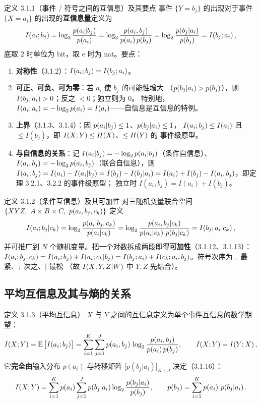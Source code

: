 \begin{defbox}{定义 3.1.1（事件 / 符号之间的互信息）及其要点}
事件 $\{Y=b_j\}$ 的出现对于事件 $\{X=a_i\}$ 的出现的\textbf{互信息量}定义为
\[
\I{a_i;b_j}=\lb\frac{\p{a_i|b_j}}{\p{a_i}}
=\lb\frac{\p{a_i,b_j}}{\p{a_i}\p{b_j}}
=\lb\frac{\p{b_j|a_i}}{\p{b_j}}=\I{b_j;a_i},
\]
底取 $2$ 时单位为 bit，取 $\mathrm{e}$ 时为 nat。要点：
\begin{enumerate}[leftmargin=1.6em,itemsep=0pt,topsep=1pt]
  \item \textbf{对称性}（3.1.2）：$I\!\left(a_i;b_j\right)=I\!\left(b_j;a_i\right)$。
  \item \textbf{可正、可负、可为零}：若 $a_i$ 使 $b_j$ 的可能性增大
        （$p\!\left(b_j|a_i\right)>p\!\left(b_j\right)$），则 $I\!\left(b_j;a_i\right)>0$；反之 $<0$；独立则为 $0$。
        特别地，$I\!\left(a_i;a_i\right)=-\log_{2}p\!\left(a_i\right)=I(a_i)$——自信息是互信息的特例。
  \item \textbf{上界}（3.1.3、3.1.4）：因 $p\!\left(a_i|b_j\right)\le1$、$p\!\left(b_j|a_i\right)\le1$，
        $I\!\left(a_i;b_j\right)\le I(a_i)$ 且 $\le I(b_j)$，即 $I\!\left(X;Y\right)\le H\!\left(X\right)$、$\le H\!\left(Y\right)$ 的
        事件级原型。
  \item \textbf{与自信息的关系}：记 $I(a_i|b_j)=-\log_{2}p\!\left(a_i|b_j\right)$（条件自信息）、
        $I(a_i,b_j)=-\log_{2}p\!\left(a_i,b_j\right)$（联合自信息），则
        $I\!\left(a_i;b_j\right)=I(a_i)-I(a_i|b_j)=I(b_j)-I(b_j|a_i)
        =I(a_i)+I(b_j)-I(a_i,b_j)$，即定理 3.2.1、3.2.2 的事件级原型；
        独立时 $I(a_i,b_j)=I(a_i)+I(b_j)$。
\end{enumerate}
\end{defbox}

\begin{defbox}{定义 3.1.2（条件互信息）及其可加性}
对三随机变量联合空间 $\{XYZ,\ A\times B\times C,\ \p{a_i,b_j,c_k}\}$ 定义
\[
I\!\left(a_i;b_j|c_k\right)=\log_{2}\frac{p\!\left(a_i|b_j,c_k\right)}{p\!\left(a_i|c_k\right)}
=\log_{2}\frac{p\!\left(a_i,b_j|c_k\right)}{p\!\left(a_i|c_k\right)\,p\!\left(b_j|c_k\right)}=I\!\left(b_j;a_i|c_k\right),
\]
并可推广到 $N$ 个随机变量。把一个对数拆成两段即得\textbf{可加性}（3.1.12、3.1.13）：
$I\!\left(a_i;b_j,c_k\right)=I\!\left(a_i;b_j\right)+I\!\left(a_i;c_k|b_j\right)
=I\!\left(b_j;a_i\right)+I\!\left(c_k;a_i,b_j\right)$。符号次序为 $,$ 最紧、$;$ 次之、$|$ 最松
（故 $I\!\left(X;Y,Z|W\right)$ 中 $Y,Z$ 先结合）。
\end{defbox}

\subsection{平均互信息及其与熵的关系}

\begin{defbox}{定义 3.1.3（平均互信息）}
$X$ 与 $Y$ 之间的互信息定义为单个事件互信息的数学期望：
\[
I\!\left(X;Y\right)=\operatorname{\mathbb{E}}\big[I(a_i;b_j)\big]
=\sum_{i=1}^{K}\sum_{j=1}^{J}p\!\left(a_i,b_j\right)\,\log_{2}\frac{p\!\left(a_i,b_j\right)}{p\!\left(a_i\right)p\!\left(b_j\right)},
\qquad I\!\left(X;Y\right)=I\!\left(Y;X\right),
\]
它\textbf{完全由}输入分布 $p(a_i)$ 与转移矩阵 $\big[p(b_j|a_i)\big]_{K\times J}$ 决定（3.1.16）：
\[
\I{X;Y}=\sum_{i=1}^{K}\p{a_i}\sum_{j=1}^{J}\p{b_j|a_i}\lb\frac{\p{b_j|a_i}}{\p{b_j}},
\qquad \p{b_j}=\sum_{i=1}^{K}\p{a_i}\,\p{b_j|a_i}.
\]
\end{defbox}

